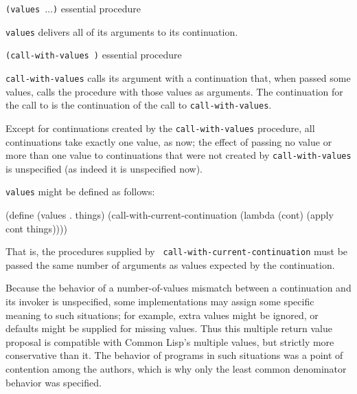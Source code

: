 \begin{list}{}{}{}\item
    {\tt(values  $\ldots$)}
        \hfill {\rm essential procedure}

    {\tt values} delivers all of its arguments to its continuation.  

    \vspace{2ex}

    {\tt(call-with-values  )}
        \hfill {\rm essential procedure}

    {\tt call-with-values} calls its  argument with a
    continuation that, when passed some values, calls the
     procedure with those values as arguments.
    The continuation for the call to  is the
    continuation of the call to {\tt call-with-values}.
\end{list}

Except for continuations created by the {\tt call-with-values}
procedure, all continuations take exactly one value, as now; the
effect of passing no value or more than one value to continuations
that were not created by {\tt call-with-values} is unspecified (as
indeed it is unspecified now).

{\tt values} might be defined as follows:
\begin{code}
    (define (values . things)
      (call-with-current-continuation 
        (lambda (cont) (apply cont things))))
\end{code}
That is, the procedures supplied by {\tt
call-with-current-continuation} must be passed the same number of
arguments as values expected by the continuation.

Because the behavior of a number-of-values mismatch between a
continuation and its invoker is unspecified, some implementations may
assign some specific meaning to such situations; for example, extra
values might be ignored, or defaults might be supplied for missing
values.  Thus this multiple return value proposal is compatible with
Common Lisp's multiple values, but strictly more conservative than it.
The behavior of programs in such situations was a point of contention
among the authors, which is why only the least common denominator
behavior was specified.



